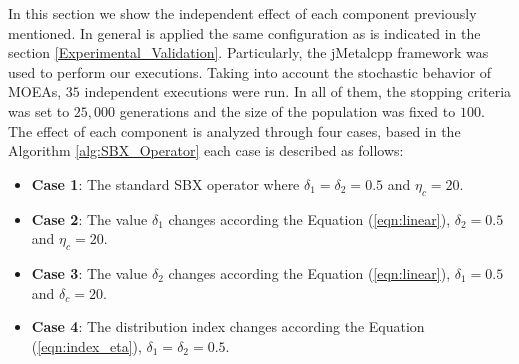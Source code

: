 In this section we show the independent effect of each component previously mentioned.
%
In general is applied the same configuration as is indicated in the section \ref{Experimental_Validation}.
%
Particularly, the jMetalcpp framework \cite{Joel:jMetal}  was used to perform our executions.
%
Taking into account the stochastic behavior of MOEAs, $35$ independent executions were run.
%
In all of them, the stopping criteria was set to $25,000$ generations and the size of the population was fixed to $100$.
%
The effect of each component is analyzed through four cases, based in the Algorithm \ref{alg:SBX_Operator} each case is described as follows:
\begin{itemize}
\item \textbf{Case 1}: The standard SBX operator where $\delta_1 = \delta_2 = 0.5$ and $\eta_c = 20$.
\item \textbf{Case 2}: The value $\delta_1$ changes according the Equation (\ref{eqn:linear}),  $\delta_2=0.5$ and $\eta_c = 20$.
\item \textbf{Case 3}: The value $\delta_2$ changes according the Equation (\ref{eqn:linear}), $\delta_1=0.5$ and $\delta_c = 20$.
\item \textbf{Case 4}: The distribution index changes according the Equation (\ref{eqn:index_eta}), $\delta_1=\delta_2=0.5$.
\end{itemize}


